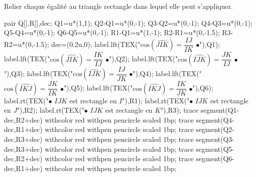         Relier chaque égalité au triangle rectangle dans lequel elle peut s'appliquer.
    \begin{center}
        \begin{Geometrie}[CoinBG={(-2u,-5u)}]
            pair Q[],R[],dec;
            Q1=u*(1,1);
            Q2-Q1=u*(0,-1);
            Q3-Q2=u*(0,-1);
            Q4-Q3=u*(0,-1);
            Q5-Q4=u*(0,-1);
            Q6-Q5=u*(0,-1);
            R1-Q1=u*(1,-1);
            R2-R1=u*(0,-1.5);
            R3-R2=u*(0,-1.5);
            dec=(0.2u,0);
            label.lft(TEX("$\text{cos}(\widehat{JIK})=\dfrac{IJ}{IK}$ $\bullet$"),Q1);
            label.lft(TEX("$\text{cos}(\widehat{JIK})=\dfrac{IK}{IJ}$ $\bullet$"),Q2);
            label.lft(TEX("$\text{cos}(\widehat{IJK})=\dfrac{JK}{IJ}$ $\bullet$"),Q3);
            label.lft(TEX("$\text{cos}(\widehat{IJK})=\dfrac{IJ}{JK}$ $\bullet$"),Q4);
            label.lft(TEX("$\text{cos}(\widehat{IKJ})=\dfrac{JK}{IK}$ $\bullet$"),Q5);
            label.lft(TEX("$\text{cos}(\widehat{IKJ})=\dfrac{IK}{JK}$ $\bullet$"),Q6);
            label.rt(TEX("$\bullet$ $IJK$ est rectangle en $I$"),R1);
            label.rt(TEX("$\bullet$ $IJK$ est rectangle en $J$"),R2);
            label.rt(TEX("$\bullet$ $IJK$ est rectangle en $K$"),R3);
            trace segment(Q1-dec,R2+dec) withcolor red withpen pencircle scaled 1bp;
            trace segment(Q4-dec,R1+dec) withcolor red withpen pencircle scaled 1bp;
            trace segment(Q2-dec,R3+dec) withcolor red withpen pencircle scaled 1bp;
            trace segment(Q3-dec,R3+dec) withcolor red withpen pencircle scaled 1bp;
            trace segment(Q5-dec,R2+dec) withcolor red withpen pencircle scaled 1bp;
            trace segment(Q6-dec,R1+dec) withcolor red withpen pencircle scaled 1bp;
        \end{Geometrie}
    \end{center}
